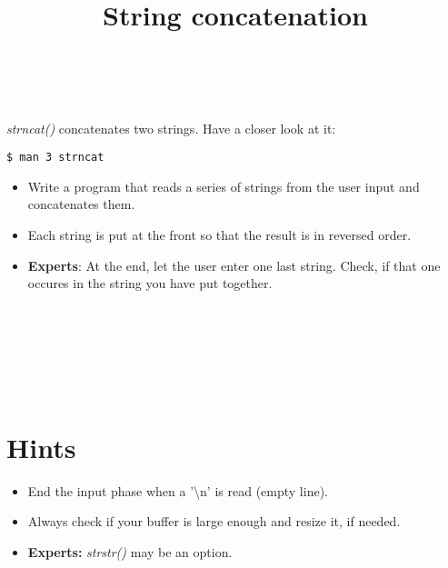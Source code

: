 

\title{String concatenation} %
\author{} %
\renewcommand{\difficulty}{Hard} %
\renewcommand{\requirements}{Dynamic storage, strings} %
\renewcommand{\aims}{allocate memory} %


 \maketitle
 \taskinfos

\ \\\ \\

\textit{strncat()} concatenates two strings. Have a closer look at it:
\begin{lstlisting}[numbers=none]
$ man 3 strncat
\end{lstlisting}
\begin{itemize}
	\item Write a program that reads a series of strings from the user input and concatenates them.
	\item Each string is put at the front so that the result is in reversed order.
	\item \textbf{Experts}: At the end, let the user enter one last string. Check, if that one occures in the string you have put together.
\end{itemize}		
 
 
\ \\\ \\\ \\\ \\\ \\
\section*{Hints}
	\begin{itemize}
		\item End the input phase when a '\textbackslash n' is read (empty line).
		\item Always check if your buffer is large enough and resize it, if needed.
		\item \textbf{Experts:} \textit{strstr()} may be an option.
	\end{itemize}
 

